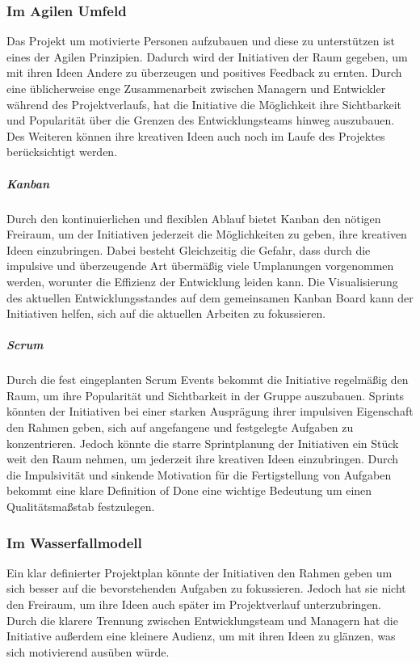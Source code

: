 \documentclass[twocolumn,10pt]{asme2ej}
\begin{document}
\subsubsection{Im Agilen Umfeld}
Das Projekt um motivierte Personen aufzubauen und diese zu unterstützen ist eines der Agilen Prinzipien. Dadurch wird der Initiativen der Raum gegeben, um mit ihren Ideen Andere zu überzeugen und positives Feedback zu ernten. Durch eine üblicherweise enge Zusammenarbeit zwischen Managern und Entwickler während des Projektverlaufs, hat die Initiative die Möglichkeit ihre Sichtbarkeit und Popularität über die Grenzen des Entwicklungsteams hinweg auszubauen. Des Weiteren können ihre kreativen Ideen auch noch im Laufe des Projektes berücksichtigt werden.

\subparagraph{Kanban} Durch den kontinuierlichen und flexiblen Ablauf bietet Kanban den nötigen Freiraum, um der Initiativen jederzeit die Möglichkeiten zu geben, ihre kreativen Ideen einzubringen. Dabei besteht Gleichzeitig die Gefahr, dass durch die impulsive und überzeugende Art übermäßig viele Umplanungen vorgenommen werden, worunter die Effizienz der Entwicklung leiden kann. Die Visualisierung des aktuellen Entwicklungsstandes auf dem gemeinsamen Kanban Board kann der Initiativen helfen, sich auf die aktuellen Arbeiten zu fokussieren. 

\subparagraph{Scrum} Durch die fest eingeplanten Scrum Events bekommt die Initiative regelmäßig den Raum, um ihre Popularität und Sichtbarkeit in der Gruppe auszubauen. Sprints könnten der Initiativen bei einer starken Ausprägung ihrer impulsiven Eigenschaft den Rahmen geben, sich auf angefangene und festgelegte Aufgaben zu konzentrieren. Jedoch könnte die starre Sprintplanung der Initiativen ein Stück weit den Raum nehmen, um jederzeit ihre kreativen Ideen einzubringen. Durch die Impulsivität und sinkende Motivation für die Fertigstellung von Aufgaben bekommt eine klare Definition of Done eine wichtige Bedeutung um einen Qualitätsmaßstab festzulegen. 

\subsubsection{Im Wasserfallmodell}
Ein klar definierter Projektplan könnte der Initiativen den Rahmen geben um sich besser auf die bevorstehenden Aufgaben zu fokussieren. Jedoch hat sie nicht den Freiraum, um ihre Ideen auch später im Projektverlauf unterzubringen. Durch die klarere Trennung zwischen Entwicklungsteam und Managern hat die Initiative außerdem eine kleinere Audienz, um mit ihren Ideen zu glänzen, was sich motivierend ausüben würde.
\end{document}
